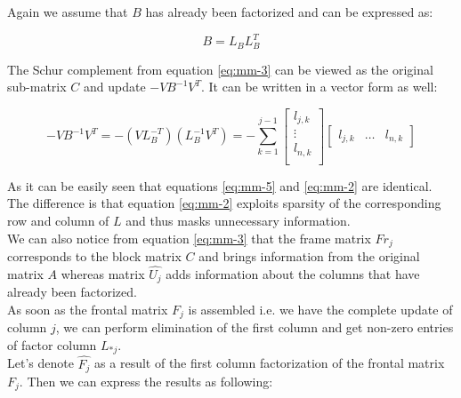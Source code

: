 Again we assume that $B$ has already been factorized and can be expressed as:

\begin{equation} \label{eq:mm-4}
	B = L_{B}L^{T}_{B}
\end{equation}

The Schur complement from equation \ref{eq:mm-3} can be viewed as the original sub-matrix $C$ and update $-VB^{-1}V^{T}$. It can be written in a vector form as well:

\begin{equation} \label{eq:mm-5}
	-VB^{-1}V^{T} = -(VL^{-T}_{B})(L^{-1}_{B}V^{T}) = - \sum_{k=1}^{j-1}  \begin{bmatrix}
l_{j,k} \\
\vdots \\
l_{n,k} \\
\end{bmatrix} \begin{bmatrix}
l_{j,k} & \dots & l_{n,k}
\end{bmatrix} 
\end{equation}

As it can be easily seen that equations \ref{eq:mm-5} and \ref{eq:mm-2} are identical. The difference is that equation \ref{eq:mm-2} exploits sparsity of the corresponding row and column of $L$ and thus masks unnecessary information. \\



We can also notice from equation \ref{eq:mm-3} that the frame matrix $Fr_{j}$ corresponds to the block matrix $C$ and brings information from the original matrix $A$ whereas matrix $\hat{U_{j}}$ adds information about the columns that have already been factorized.\\

As soon as the frontal matrix $F_{j}$ is assembled i.e. we have the complete update of column $j$, we can perform elimination of the first column and get non-zero entries of factor column $L_{*j}$.\\

Let's denote $\hat{F_{j}}$ as a result of the first column factorization of the frontal matrix $F_{j}$. Then we can express the results as following:\\


